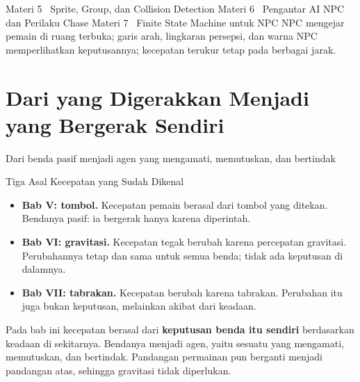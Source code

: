 \documentclass[aspectratio=169,10pt]{beamer}
\begin{document}
  {Materi 5 \textperiodcentered\ Sprite, Group, dan Collision Detection}
  {Materi 6 \textperiodcentered\ Pengantar AI NPC dan Perilaku Chase}
  {Materi 7 \textperiodcentered\ Finite State Machine untuk NPC}
  {NPC mengejar pemain di ruang terbuka; garis arah, lingkaran persepsi, dan
   warna NPC memperlihatkan keputusannya; kecepatan terukur tetap pada berbagai
   jarak.}

\section{Dari yang Digerakkan Menjadi yang Bergerak Sendiri}
  {Dari benda pasif menjadi agen yang mengamati, memutuskan, dan bertindak}

\begin{frame}{Tiga Asal Kecepatan yang Sudah Dikenal}
\begin{itemize}
  \item \textbf{Bab V: tombol.} Kecepatan pemain berasal dari tombol yang
        ditekan. Bendanya pasif: ia bergerak hanya karena diperintah.
  \item \textbf{Bab VI: gravitasi.} Kecepatan tegak berubah karena percepatan
        gravitasi. Perubahannya tetap dan sama untuk semua benda; tidak ada
        keputusan di dalamnya.
  \item \textbf{Bab VII: tabrakan.} Kecepatan berubah karena tabrakan.
        Perubahan itu juga bukan keputusan, melainkan akibat dari keadaan.
\end{itemize}
\vspace{0.16cm}
\begin{kotak}
Pada bab ini kecepatan berasal dari \textbf{keputusan benda itu sendiri}
berdasarkan keadaan di sekitarnya. Bendanya menjadi agen, yaitu sesuatu yang
mengamati, memutuskan, dan bertindak. Pandangan permainan pun berganti menjadi
pandangan atas, sehingga gravitasi tidak diperlukan.
\end{kotak}
\end{frame}
\end{document}
